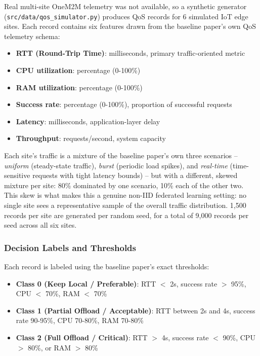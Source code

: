 Real multi-site OneM2M telemetry was not available, so a synthetic generator (\texttt{src/data/qos\_simulator.py}) produces QoS records for 6 simulated IoT edge sites. Each record contains six features drawn from the baseline paper's own QoS telemetry schema:
\begin{itemize}
  \item \textbf{RTT (Round-Trip Time)}: milliseconds, primary traffic-oriented metric
  \item \textbf{CPU utilization}: percentage (0-100\%)
  \item \textbf{RAM utilization}: percentage (0-100\%)
  \item \textbf{Success rate}: percentage (0-100\%), proportion of successful requests
  \item \textbf{Latency}: milliseconds, application-layer delay
  \item \textbf{Throughput}: requests/second, system capacity
\end{itemize}

Each site's traffic is a mixture of the baseline paper's own three scenarios -- \textit{uniform} (steady-state traffic), \textit{burst} (periodic load spikes), and \textit{real-time} (time-sensitive requests with tight latency bounds) -- but with a different, skewed mixture per site: 80\% dominated by one scenario, 10\% each of the other two. This skew is what makes this a genuine non-IID federated learning setting: no single site sees a representative sample of the overall traffic distribution. 1,500 records per site are generated per random seed, for a total of 9,000 records per seed across all six sites.

\subsubsection{Decision Labels and Thresholds}
Each record is labeled using the baseline paper's exact thresholds:
\begin{itemize}
  \item \textbf{Class 0 (Keep Local / Preferable)}: RTT $<$ 2s, success rate $>$ 95\%, CPU $<$ 70\%, RAM $<$ 70\%
  \item \textbf{Class 1 (Partial Offload / Acceptable)}: RTT between 2s and 4s, success rate 90-95\%, CPU 70-80\%, RAM 70-80\%
  \item \textbf{Class 2 (Full Offload / Critical)}: RTT $>$ 4s, success rate $<$ 90\%, CPU $>$ 80\%, or RAM $>$ 80\%
\end{itemize}

